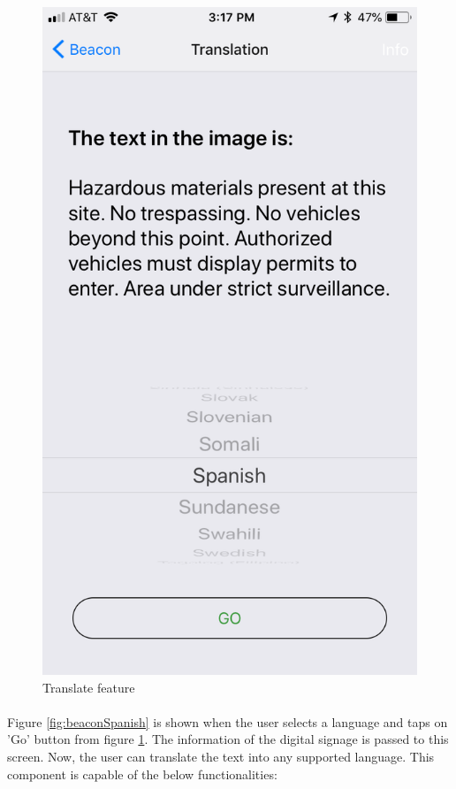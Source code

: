 \documentclass[12pt]{article}
\begin{document}
\begin{figure} [H]
\begin{minipage}{.5\textwidth}
  \includegraphics[width=0.9\linewidth]{media/beacon2.PNG}
  \caption{Translate feature}
  \label{fig:beaconTranslate}
\end{minipage}
\end{figure}


\paragraph{}Figure \ref{fig:beaconSpanish} is shown when the user selects a language and taps on 'Go' button from figure \ref{fig:beaconTranslate}. The information of the digital signage is passed to this screen. Now, the user can translate the text into any supported language. This component is capable of the below functionalities:
\end{document}

